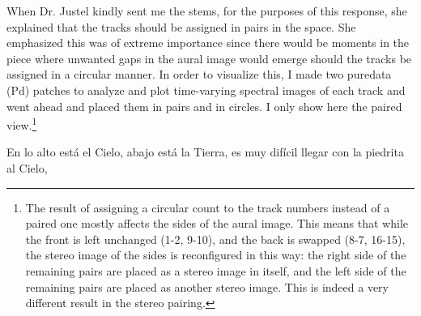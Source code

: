 \documentclass{article}
\begin{document}
When Dr. Justel kindly sent me the stems, for the purposes of this response, she explained that the tracks should be assigned in pairs in the space. She emphasized this was of extreme importance since there would be moments in the piece where unwanted gaps in the aural image would emerge should the tracks be assigned in a circular manner. In order to visualize this, I made two puredata (Pd) patches to analyze and plot time-varying spectral images of each track and went ahead and placed them in pairs and in circles. I only show here the paired view.\footnote{The result of assigning a circular count to the track numbers instead of a paired one mostly affects the sides of the aural image. This means that while the front is left unchanged (1-2, 9-10), and the back is swapped (8-7, 16-15), the stereo image of the sides is reconfigured in this way: the right side of the remaining pairs are placed as a stereo image in itself, and the left side of the remaining pairs are placed as another stereo image. This is indeed a very different result in the stereo pairing.}

\begin{center}

En lo alto est\'{a} el Cielo, abajo est\'{a} la Tierra, es muy dif\'{i}cil llegar con la piedrita al Cielo, 

\end{center}
\end{document}
